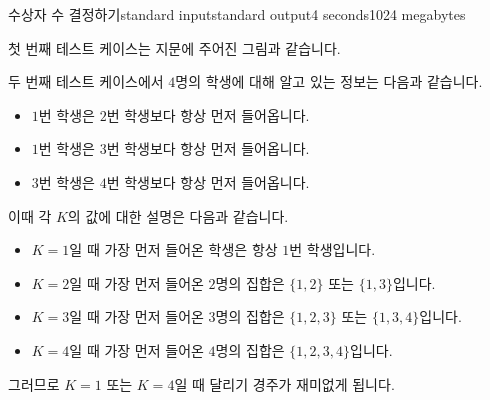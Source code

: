 \begin{problem}{수상자 수 결정하기}{standard input}{standard output}{4 seconds}{1024 megabytes}
\Example

\begin{example}
%
\end{example}

\Note
첫 번째 테스트 케이스는 지문에 주어진 그림과 같습니다.

두 번째 테스트 케이스에서 $4$명의 학생에 대해 알고 있는 정보는 다음과 같습니다.

\begin{itemize}
\item $1$번 학생은 $2$번 학생보다 항상 먼저 들어옵니다.
\item $1$번 학생은 $3$번 학생보다 항상 먼저 들어옵니다.
\item $3$번 학생은 $4$번 학생보다 항상 먼저 들어옵니다. 
\end{itemize}

이때 각 $K$의 값에 대한 설명은 다음과 같습니다.

\begin{itemize}
\item $K=1$일 때 가장 먼저 들어온 학생은 항상 $1$번 학생입니다.
\item $K=2$일 때 가장 먼저 들어온 $2$명의 집합은 $\{1,2\}$ 또는 $\{1,3\}$입니다.
\item $K=3$일 때 가장 먼저 들어온 $3$명의 집합은 $\{1,2,3\}$ 또는 $\{1,3,4\}$입니다.
\item $K=4$일 때 가장 먼저 들어온 $4$명의 집합은 $\{1,2,3,4\}$입니다.
\end{itemize}

그러므로 $K=1$ 또는 $K=4$일 때 달리기 경주가 재미없게 됩니다.

\end{problem}

